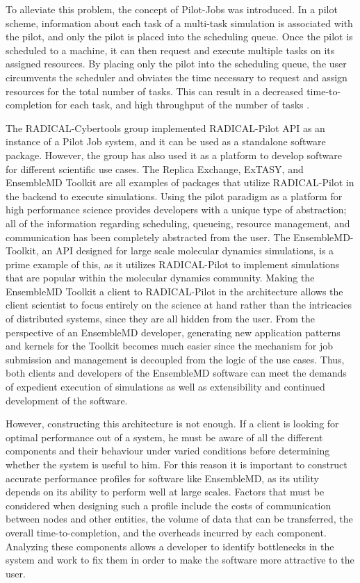 \documentclass[]{article}
\begin{document}
		To alleviate this problem, the concept of Pilot-Jobs was introduced. In a pilot scheme, information about each task of a multi-task simulation is associated with the pilot, and only the pilot is placed into the scheduling queue. Once the pilot is scheduled to a machine, it can then request and execute multiple tasks on its assigned resources. By placing only the pilot into the scheduling queue, the user circumvents the scheduler and obviates the time necessary to request and assign resources for the total number of tasks. This can result in a decreased time-to-completion for each task, and high throughput of the number of tasks \cite{rp_paper}.

		The RADICAL-Cybertools group implemented RADICAL-Pilot API as an instance of a Pilot Job system, and it can be used as a standalone software package. However, the group has also used it as a platform to develop software for different scientific use cases. The Replica Exchange, ExTASY, and EnsembleMD Toolkit are all examples of packages that utilize RADICAL-Pilot in the backend to execute simulations. Using the pilot paradigm as a platform for high performance science provides developers with a unique type of abstraction; all of the information regarding scheduling, queueing, resource management, and communication has been completely abstracted from the user. The EnsembleMD-Toolkit, an API designed for large scale molecular dynamics simulations, is a prime example of this, as it utilizes RADICAL-Pilot to implement simulations that are popular within the molecular dynamics community. Making the EnsembleMD Toolkit a client to RADICAL-Pilot in the architecture allows the client scientist to focus entirely on the science at hand rather than the intricacies of distributed systems, since they are all hidden from the user. From the perspective of an EnsembleMD developer, generating new application patterns and kernels for the Toolkit becomes much easier since the mechanism for job submission and management is decoupled from the logic of the use cases. Thus, both clients and developers of the EnsembleMD software can meet the demands of expedient execution of simulations as well as extensibility and continued development of the software.

		However, constructing this architecture is not enough. If a client is looking for optimal performance out of a system, he must be aware of all the different components and their behaviour under varied conditions before determining whether the system is useful to him. For this reason it is important to construct accurate performance profiles for software like EnsembleMD, as its utility depends on its ability to perform well at large scales. Factors that must be considered when designing such a profile include the costs of communication between nodes and other entities, the volume of data that can be transferred, the overall time-to-completion, and the overheads incurred by each component. Analyzing these components allows a developer to identify bottlenecks in the system and work to fix them in order to make the software more attractive to the user.
\end{document}

